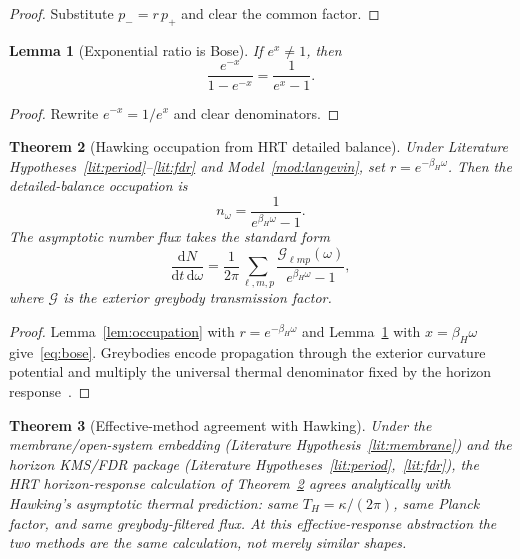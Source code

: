 \documentclass[11pt]{article}
\newtheorem{theorem}{Theorem}[section]
\newtheorem{lemma}[theorem]{Lemma}
\theoremstyle{definition}
\theoremstyle{remark}
\newcommand{\dd}{\mathrm{d}}
\begin{document}
\begin{proof}
Substitute $p_-=r\,p_+$ and clear the common factor.
\end{proof}

\begin{lemma}[Exponential ratio is Bose]
\label{lem:bose}
If $e^{x}\neq1$, then
\[
\frac{e^{-x}}{1-e^{-x}}=\frac{1}{e^{x}-1}.
\]
\end{lemma}

\begin{proof}
Rewrite $e^{-x}=1/e^{x}$ and clear denominators.
\end{proof}

\begin{theorem}[Hawking occupation from HRT detailed balance]
\label{thm:hawking-occupation}
Under Literature Hypotheses~\ref{lit:period}--\ref{lit:fdr} and
Model~\ref{mod:langevin}, set $r=e^{-\beta_H\omega}$.
Then the detailed-balance occupation is
\begin{equation}
\label{eq:bose}
n_\omega=\frac{1}{e^{\beta_H\omega}-1}.
\end{equation}
The asymptotic number flux takes the standard form
\begin{equation}
\label{eq:flux}
\frac{\dd N}{\dd t\,\dd\omega}
=\frac{1}{2\pi}\sum_{\ell,m,p}
\frac{\mathcal G_{\ell mp}(\omega)}{e^{\beta_H\omega}-1},
\end{equation}
where $\mathcal G$ is the exterior greybody transmission factor.
\end{theorem}

\begin{proof}
Lemma~\ref{lem:occupation} with $r=e^{-\beta_H\omega}$ and Lemma~\ref{lem:bose} with
$x=\beta_H\omega$ give~\eqref{eq:bose}.
Greybodies encode propagation through the exterior curvature potential and multiply
the universal thermal denominator fixed by the horizon response~\cite{Hawking1975}.
\end{proof}

\begin{theorem}[Effective-method agreement with Hawking]
\label{thm:hawking-equiv}
Under the membrane/open-system embedding (Literature Hypothesis~\ref{lit:membrane}) and
the horizon KMS/FDR package (Literature Hypotheses~\ref{lit:period},~\ref{lit:fdr}),
the HRT horizon-response calculation of Theorem~\ref{thm:hawking-occupation} agrees
analytically with Hawking's asymptotic thermal prediction:
same $T_H=\kappa/(2\pi)$, same Planck factor, and same greybody-filtered flux.
At this effective-response abstraction the two methods are the same calculation, not
merely similar shapes.
\end{theorem}
\end{document}
